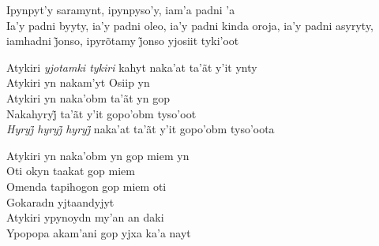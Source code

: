 \bigskip

\begin{linenumbers}\begingroup\raggedright
 
\noindent   Ipynpyt'y saramynt, ipynpyso'y, iam'a padni 'a\\
  Ia’y padni byyty, ia’y padni oleo, ia’y padni kinda oroja, ia’y padni asyryty, iamhadni j̃onso, ipyrõtamy j̃onso yjosiit tyki’oot
 
\end{linenumbers}\endgroup

\bigskip

\begin{linenumbers}\begingroup\raggedright
 
\noindent   Atykiri \textit{yjotamki tykiri} kahyt naka'at ta'ãt y'it ynty\\
  Atykiri yn nakam'yt Osiip yn\\
  Atykiri yn naka'obm ta'ãt yn gop\\
  Nakahyryj̃ ta’ãt y’it gopo’obm tyso’oot\\
  \textit{Hyryj̃ hyryj̃ hyryj̃ }naka’at ta’ãt y’it gopo’obm tyso’oota
 
\end{linenumbers}\endgroup

\bigskip

\begin{linenumbers}\begingroup\raggedright
 
\noindent   Atykiri yn naka'obm yn gop miem yn\\
  Oti okyn taakat gop miem\\
  Omenda tapihogon gop miem oti\\
  Gokaradn yjtaandyjyt\\
  Atykiri ypynoydn my'an an daki\\
  Ypopopa akam'ani gop yjxa ka'a nayt
 
\end{linenumbers}\endgroup

